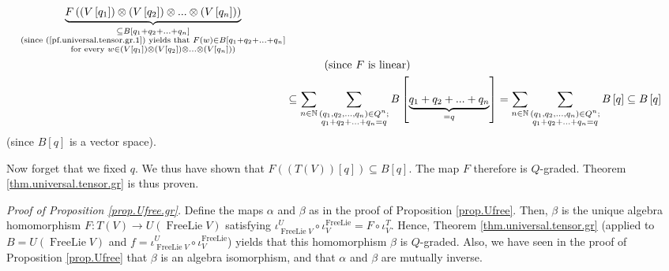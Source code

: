 \documentclass[etingof-lie.tex]{subfiles}
\begin{document}
\begin{verlong}
\begin{align*}
{}\underbrace{F\left(  \left(  V\left[  q_{1}\right]  \right)  \otimes\left(
V\left[  q_{2}\right]  \right)  \otimes...\otimes\left(  V\left[
q_{n}\right]  \right)  \right)  }_{\substack{\subseteq B\left[  q_{1}%
+q_{2}+...+q_{n}\right]  \\\text{(since (\ref{pf.universal.tensor.gr.1})
yields that }F\left(  w\right)  \in B\left[  q_{1}+q_{2}+...+q_{n}\right]
\\\text{for every }w\in\left(  V\left[  q_{1}\right]  \right)  \otimes\left(
V\left[  q_{2}\right]  \right)  \otimes...\otimes\left(  V\left[
q_{n}\right]  \right)  \text{)}}}\\
&  \ \ \ \ \ \ \ \ \ \ \left(  \text{since }F\text{ is linear}\right) \\
&  \subseteq\sum\limits_{n\in\mathbb{N}}\sum\limits_{\substack{\left(
q_{1},q_{2},...,q_{n}\right)  \in Q^{n};\\q_{1}+q_{2}+...+q_{n}=q}}B\left[
\underbrace{q_{1}+q_{2}+...+q_{n}}_{=q}\right]  =\sum\limits_{n\in\mathbb{N}%
}\sum\limits_{\substack{\left(  q_{1},q_{2},...,q_{n}\right)  \in
Q^{n};\\q_{1}+q_{2}+...+q_{n}=q}}B\left[  q\right]  \subseteq B\left[
q\right]
\end{align*}
(since $B\left[  q\right]  $ is a vector space).

Now forget that we fixed $q$. We thus have shown that $F\left(  \left(
T\left(  V\right)  \right)  \left[  q\right]  \right)  \subseteq B\left[
q\right]  $. The map $F$ therefore is $Q$-graded. Theorem
\ref{thm.universal.tensor.gr} is thus proven.

\textit{Proof of Proposition \ref{prop.Ufree.gr}.} Define the maps $\alpha$
and $\beta$ as in the proof of Proposition \ref{prop.Ufree}. Then, $\beta$ is
the unique algebra homomorphism $F:T\left(  V\right)  \rightarrow U\left(
\operatorname*{FreeLie}V\right)  $ satisfying $\iota_{\operatorname*{FreeLie}%
V}^{U}\circ\iota_{V}^{\operatorname*{FreeLie}}=F\circ\iota_{V}^{T}$. Hence,
Theorem \ref{thm.universal.tensor.gr} (applied to $B=U\left(
\operatorname*{FreeLie}V\right)  $ and $f=\iota_{\operatorname*{FreeLie}V}%
^{U}\circ\iota_{V}^{\operatorname*{FreeLie}}$) yields that this homomorphism
$\beta$ is $Q$-graded. Also, we have seen in the proof of Proposition
\ref{prop.Ufree} that $\beta$ is an algebra isomorphism, and that $\alpha$ and
$\beta$ are mutually inverse.


\end{verlong}
\end{document}
